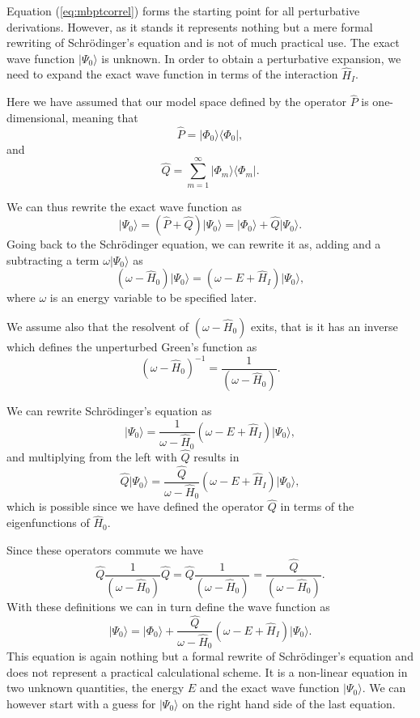   Equation (\ref{eq:mbptcorrel}) forms the starting point for all perturbative
  derivations. However, as it stands it represents nothing but a mere
  formal rewriting of Schr\"odinger's equation and is not of much
  practical use. The exact wave function $\vert \Psi_0\rangle$ is
  unknown. In order to obtain a perturbative expansion, we need to
  expand the exact wave function in terms of the interaction
  $\hat{H}_I$.

  Here we have assumed that our model space defined by the operator
  $\hat{P}$ is one-dimensional, meaning that
  \[
  \hat{P}= \vert \Phi_0\rangle \langle \Phi_0\vert ,
  \]
  and
  \[
  \hat{Q}=\sum_{m=1}^{\infty}\vert \Phi_m\rangle \langle \Phi_m\vert .
  \]


  We can thus rewrite the exact wave function as
  \[
  \vert \Psi_0\rangle= (\hat{P}+\hat{Q})\vert \Psi_0\rangle=\vert
  \Phi_0\rangle+\hat{Q}\vert \Psi_0\rangle.
  \]
  Going back to the Schr\"odinger equation, we can rewrite it as,
  adding and a subtracting a term $\omega \vert \Psi_0\rangle$ as
  \[
  \left(\omega-\hat{H}_0\right)\vert
  \Psi_0\rangle=\left(\omega-E+\hat{H}_I\right)\vert \Psi_0\rangle,
  \]
  where $\omega$ is an energy variable to be specified later.


  We assume also that the resolvent of $\left(\omega-\hat{H}_0\right)$
  exits, that is it has an inverse which defines the unperturbed
  Green's function as
  \[
  \left(\omega-\hat{H}_0\right)^{-1}=\frac{1}{\left(\omega-\hat{H}_0\right)}.
  \]

  We can rewrite Schr\"odinger's equation as
  \[
  \vert
  \Psi_0\rangle=\frac{1}{\omega-\hat{H}_0}\left(\omega-E+\hat{H}_I\right)\vert
  \Psi_0\rangle,
  \]
  and multiplying from the left with $\hat{Q}$ results in
  \[
  \hat{Q}\vert
  \Psi_0\rangle=\frac{\hat{Q}}{\omega-\hat{H}_0}\left(\omega-E+\hat{H}_I\right)\vert
  \Psi_0\rangle,
  \]
  which is possible since we have defined the operator $\hat{Q}$ in
  terms of the eigenfunctions of $\hat{H}_0$.

 Since these operators commute we have
  \[
  \hat{Q}\frac{1}{\left(\omega-\hat{H}_0\right)}\hat{Q}=\hat{Q}\frac{1}{\left(\omega-\hat{H}_0\right)}=\frac{\hat{Q}}{\left(\omega-\hat{H}_0\right)}.
  \]
  With these definitions we can in turn define the wave function as
  \[
  \vert \Psi_0\rangle=\vert
  \Phi_0\rangle+\frac{\hat{Q}}{\omega-\hat{H}_0}\left(\omega-E+\hat{H}_I\right)\vert
  \Psi_0\rangle.
  \]
  This equation is again nothing but a formal rewrite of
  Schr\"odinger's equation and does not represent a practical
  calculational scheme.  It is a non-linear equation in two unknown
  quantities, the energy $E$ and the exact wave function $\vert
  \Psi_0\rangle$. We can however start with a guess for $\vert
  \Psi_0\rangle$ on the right hand side of the last equation.




